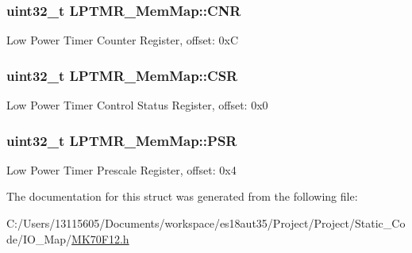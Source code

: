 \subsubsection[{C\+N\+R}]{\setlength{\rightskip}{0pt plus 5cm}uint32\+\_\+t L\+P\+T\+M\+R\+\_\+\+Mem\+Map\+::\+C\+N\+R}\label{struct_l_p_t_m_r___mem_map_adda036ea26ea5cc89d7957779c5680f0}
Low Power Timer Counter Register, offset\+: 0x\+C \hypertarget{struct_l_p_t_m_r___mem_map_a4dcb593756f09d67e3d064d95e3f2d68}{}
\subsubsection[{C\+S\+R}]{\setlength{\rightskip}{0pt plus 5cm}uint32\+\_\+t L\+P\+T\+M\+R\+\_\+\+Mem\+Map\+::\+C\+S\+R}\label{struct_l_p_t_m_r___mem_map_a4dcb593756f09d67e3d064d95e3f2d68}
Low Power Timer Control Status Register, offset\+: 0x0 \hypertarget{struct_l_p_t_m_r___mem_map_a05f0c5c90722e5a1757c262c818d2462}{}
\subsubsection[{P\+S\+R}]{\setlength{\rightskip}{0pt plus 5cm}uint32\+\_\+t L\+P\+T\+M\+R\+\_\+\+Mem\+Map\+::\+P\+S\+R}\label{struct_l_p_t_m_r___mem_map_a05f0c5c90722e5a1757c262c818d2462}
Low Power Timer Prescale Register, offset\+: 0x4 

The documentation for this struct was generated from the following file\+:\begin{DoxyCompactItemize}
\item 
C\+:/\+Users/13115605/\+Documents/workspace/es18aut35/\+Project/\+Project/\+Static\+\_\+\+Code/\+I\+O\+\_\+\+Map/\hyperlink{_m_k70_f12_8h}{M\+K70\+F12.\+h}\end{DoxyCompactItemize}
